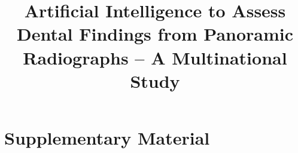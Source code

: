 \documentclass[10pt]{article}
\title{Artificial Intelligence to Assess Dental Findings from Panoramic Radiographs -- A Multinational Study}
\date{}
\begin{document}
\maketitle


\newpage





\newpage

\section*{Supplementary Material}
\setcounter{section}{0}
\renewcommand{\thesection}{\Alph{section}}

\newpage


\end{document}
